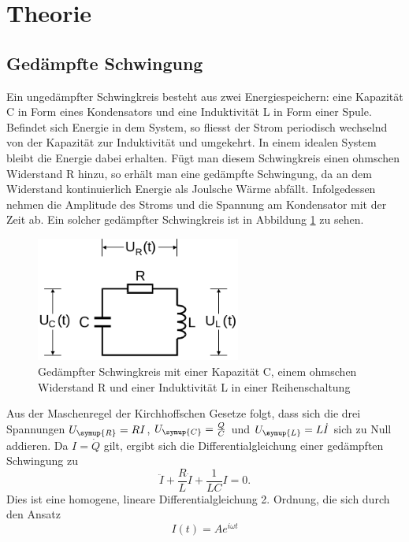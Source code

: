 \section{Theorie}
\label{sec:Theorie}
\subsection{Gedämpfte Schwingung}
Ein ungedämpfter Schwingkreis besteht aus zwei Energiespeichern: eine Kapazität C
in Form eines Kondensators und eine Induktivität L in Form einer Spule. Befindet
sich Energie in dem System, so fliesst der Strom periodisch wechselnd von der
Kapazität zur Induktivität und umgekehrt. In einem idealen System bleibt die Energie
dabei erhalten.
Fügt man diesem Schwingkreis einen ohmschen Widerstand R hinzu, so erhält man eine
gedämpfte Schwingung, da an dem Widerstand kontinuierlich Energie als Joulsche Wärme
abfällt. Infolgedessen nehmen die Amplitude des Stroms und die Spannung am
Kondensator mit der Zeit ab. Ein solcher gedämpfter Schwingkreis ist in Abbildung
\ref{fig:gedaempfter_schwingkreis} zu sehen.
\begin{figure}
  \centering
  \includegraphics[width=0.6\textwidth]{gedaempfter_schwingkreis.png}
  \caption{Gedämpfter Schwingkreis mit einer Kapazität C, einem ohmschen Widerstand R
  und einer Induktivität L in einer Reihenschaltung \cite{sample}}
  \label{fig:gedaempfter_schwingkreis}
\end{figure}
Aus der Maschenregel der Kirchhoffschen Gesetze folgt, dass sich die drei Spannungen
$U_\symup{R} = R I$, $U_\symup{C} = \frac{Q}{C}$ und $U_\symup{L} = L \dot{I}$
sich zu Null addieren. Da $I=\dot{Q}$ gilt, ergibt sich die Differentialgleichung
einer gedämpften Schwingung zu
\begin{equation}
  \ddot{I} + \frac{R}{L}\dot{I} + \frac{1}{L C} I = 0.
  \label{eqn:dgl1}
\end{equation}
Dies ist eine homogene, lineare Differentialgleichung 2. Ordnung, die sich durch
den Ansatz
\begin{equation}
  I(t) = A e^{i \omega t}
  \label{eqn:ansatz}
\end{equation}
